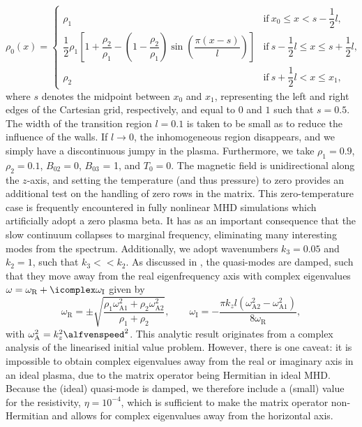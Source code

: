 \begin{equation}
  \rho_0(x) =
  \begin{cases}
    \rho_1 &\text{if}~x_0 \leq x < s - \dfrac{1}{2}l, \\
    \dfrac{1}{2}\rho_1\left[
      1 + \dfrac{\rho_2}{\rho_1} - \left(1 - \dfrac{\rho_2}{\rho_1}\right)\sin\left(\dfrac{\pi(x - s)}{l}\right)
    \right] &\text{if}~s - \dfrac{1}{2}l \leq x \leq s + \dfrac{1}{2}l, \\
    \rho_2 &\text{if}~s + \dfrac{1}{2}l < x \leq x_1,
  \end{cases}
\end{equation}
where $s$ denotes the midpoint between $x_0$ and $x_1$, representing the left and right edges of the Cartesian grid, respectively, and equal to $0$ and $1$ such that $s = 0.5$. The width of the transition region $l = 0.1$ is taken to be small as to reduce the influence of the walls. If $l \rightarrow 0$, the inhomogeneous region disappears, and we simply have a discontinuous jumpy in the plasma. Furthermore, we take $\rho_1 = 0.9$, $\rho_2 = 0.1$, $B_{02} = 0$, $B_{03}$ = 1, and $T_0 = 0$. The magnetic field is unidirectional along the $z$-axis, and setting the temperature (and thus pressure) to zero provides an additional test on the handling of zero rows in the matrix. This zero-temperature case is frequently encountered in fully nonlinear MHD simulations which artificially adopt a zero plasma beta. It has as an important consequence that the slow continuum collapses to marginal frequency, eliminating many interesting modes from the spectrum. Additionally, we adopt wavenumbers $k_3 = 0.05$ and $k_2 = 1$, such that $k_3 << k_2$. As discussed in \citet{book_priest}, the quasi-modes are damped, such that they move away from the real eigenfrequency axis with complex eigenvalues $\omega = \omega_\text{R} + \icomplex \omega_\text{I}$ given by
\begin{equation} \label{eq: quasimode}
  \omega_\text{R} = \pm \sqrt{\frac{\rho_1 \omega_\text{A1}^2 + \rho_2 \omega_\text{A2}^2}{\rho_1 + \rho_2}},
  \qquad
  \omega_\text{I} = -\frac{\pi k_z l \left(\omega_\text{A2}^2 - \omega_\text{A1}^2\right)}{8\omega_\text{R}},
\end{equation}
with $\omega_\text{A}^2 = k_z^2 \alfvenspeed^2$. This analytic result originates from a complex analysis of the linearised initial value problem. However, there is one caveat: it is impossible to obtain complex eigenvalues away from the real or imaginary axis in an ideal plasma, due to the matrix operator being Hermitian in ideal MHD. Because the (ideal) quasi-mode is damped, we therefore include a (small) value for the resistivity, $\eta = 10^{-4}$, which is sufficient to make the matrix operator non-Hermitian and allows for complex eigenvalues away from the horizontal axis.

